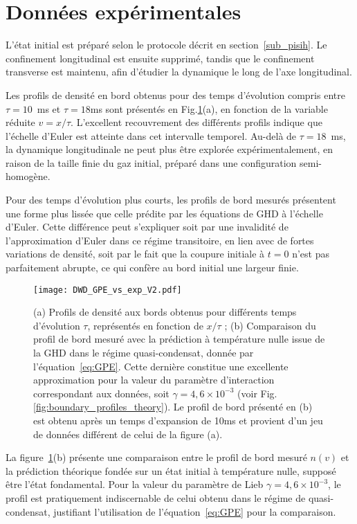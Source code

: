 \section{Données expérimentales}\label{sec.ed}

L’état initial est préparé selon le protocole décrit en section~\ref{sub_pisih}. Le confinement longitudinal est ensuite supprimé, tandis que le confinement transverse est maintenu, afin d'étudier la dynamique le long de l’axe longitudinal.

Les profils de densité en bord obtenus pour des temps d’évolution compris entre $\tau = 10$~ms et $\tau = 18$ms sont présentés en Fig.\ref{fig:euler}(a), en fonction de la variable réduite $v = x/\tau$. L’excellent recouvrement des différents profils indique que l’échelle d’Euler est atteinte dans cet intervalle temporel. Au-delà de $\tau = 18$~ms, la dynamique longitudinale ne peut plus être explorée expérimentalement, en raison de la taille finie du gaz initial, préparé dans une configuration semi-homogène.

Pour des temps d’évolution plus courts, les profils de bord mesurés présentent une forme plus lissée que celle prédite par les équations de GHD à l’échelle d’Euler. Cette différence peut s’expliquer soit par une invalidité de l’approximation d’Euler dans ce régime transitoire, en lien avec de fortes variations de densité, soit par le fait que la coupure initiale à $t = 0$ n’est pas parfaitement abrupte, ce qui confère au bord initial une largeur finie.

\begin{figure}[!htb]
\centering
\texttt{[image: DWD\_GPE\_vs\_exp\_V2.pdf]}
\caption{(a) Profils de densité aux bords obtenus pour différents temps d’évolution $\tau$, représentés en fonction de $x/\tau$ ; (b) Comparaison du profil de bord mesuré avec la prédiction à température nulle issue de la GHD dans le régime quasi-condensat, donnée par l’équation~\eqref{eq:GPE}. Cette dernière constitue une excellente approximation pour la valeur du paramètre d’interaction correspondant aux données, soit $\gamma = 4{,}6 \times 10^{-3}$ (voir Fig.\ref{fig:boundary_profiles_theory}). Le profil de bord présenté en (b) est obtenu après un temps d’expansion de 10ms et provient d’un jeu de données différent de celui de la figure (a).}
\label{fig:euler}
\end{figure}

La figure~\ref{fig:euler}(b) présente une comparaison entre le profil de bord mesuré $n(v)$ et la prédiction théorique fondée sur un état initial à température nulle, supposé être l’état fondamental. Pour la valeur du paramètre de Lieb $\gamma = 4{,}6 \times 10^{-3}$, le profil est pratiquement indiscernable de celui obtenu dans le régime de quasi-condensat, justifiant l’utilisation de l’équation~\eqref{eq:GPE} pour la comparaison.

